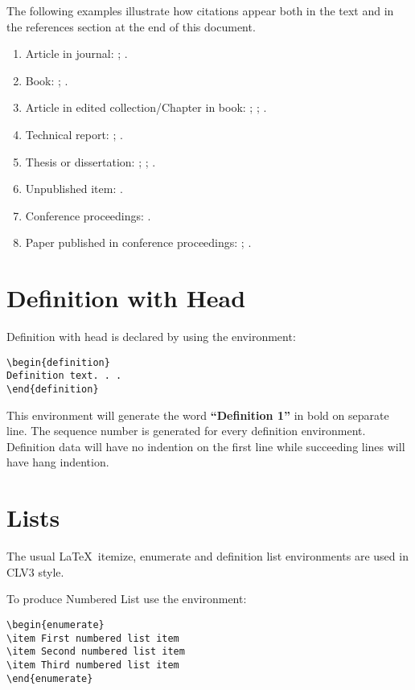 \documentclass{clv3}
\begin{document}
The following examples illustrate how citations appear both in the text
and in the references section at the end of this document.
\begin{enumerate}
\item Article in journal:
 ;
 .
\item Book:
  ;
  .
\item Article in edited collection/Chapter in book:
  ;
  ;
  .
\item Technical report:
  ;
  .
\item Thesis or dissertation:
  ;
  ;
  .
\item Unpublished item:
  .
\item Conference proceedings:
  .
\item Paper published in conference proceedings:
  ;
  .
\end{enumerate}


\section{Definition with Head}

Definition with head is declared by using the environment:
\\
\begin{verbatim}
\begin{definition}
Definition text. . .
\end{definition}
\end{verbatim}

This environment will generate the word {\bf ``Definition 1''} in bold on separate
line. The sequence number is generated for every definition environment. Definition
data will have no indention on the first line while succeeding lines will have hang
indention.

\section{Lists}

The usual \LaTeX\ itemize, enumerate and definition list environments are used
in CLV3 style.

To produce Numbered List use the environment:

\begin{verbatim}
\begin{enumerate}
\item First numbered list item
\item Second numbered list item
\item Third numbered list item
\end{enumerate}
\end{verbatim}
\end{document}

